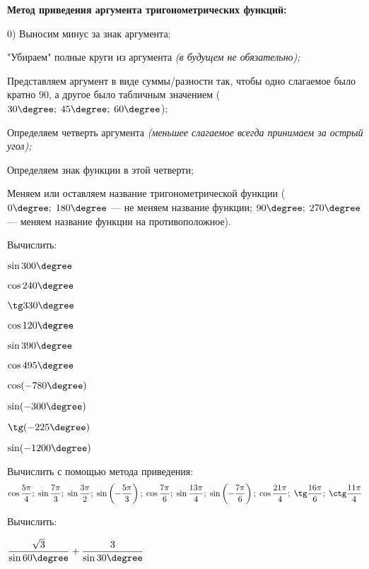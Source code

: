 \begin{listofex}
	\item \textbf{Метод приведения аргумента тригонометрических функций:}
	\begin{enumcols}
		\item[0)] Выносим минус за знак аргумента;
		\item "Убираем"{ }полные круги из аргумента \textit{(в будущем не обязательно);}
		\item Представляем аргумент в виде суммы/разности так, чтобы одно слагаемое было кратно \( 90 \), а другое было табличным значением (\( 30\degree;\;45\degree;\;60\degree \));
		\item Определяем четверть аргумента \textit{(меньшее слагаемое всегда принимаем за острый угол);}
		\item Определяем знак функции в этой четверти;
		\item Меняем или оставляем название тригонометрической функции (\( 0\degree;\;180\degree \) --- не меняем название функции; \( 90\degree;\;270\degree \) --- меняем название функции на противоположное).
	\end{enumcols}
	\item Вычислить:
	\begin{enumcols}[itemcolumns=5]
		\item \( \sin 300\degree \)
		\item \( \cos 240\degree \)
		\item \( \tg 330\degree \)
		\item \( \cos 120\degree \)
		\item \( \sin 390\degree \)
		\item \( \cos 495\degree \)
		\item \( \cos (-780\degree) \)
		\item \( \sin (-300\degree) \)
		\item \( \tg (-225\degree) \)
		\item \( \sin (-1200\degree) \)
	\end{enumcols}
	\item Вычислить с помощью метода приведения:
	\[ \cos\dfrac{5\pi}{4};\;\sin\dfrac{7\pi}{3};\;\sin\dfrac{3\pi}{2};\;\sin\left( -\dfrac{5\pi}{3} \right);\;\cos\dfrac{7\pi}{6};\;\sin\dfrac{13\pi}{4};\;\sin\left( -\dfrac{7\pi}{6}  \right);\;\cos\dfrac{21\pi}{4};\;\tg\dfrac{16\pi}{6};\;\ctg\dfrac{11\pi}{4} \]
	\item Вычислить:
	\begin{enumcols}[itemcolumns=2]
		\item \( \dfrac{\sqrt{3}}{\sin60\degree}+\dfrac{3}{\sin30\degree} \)

\end{enumcols}
\end{listofex}

